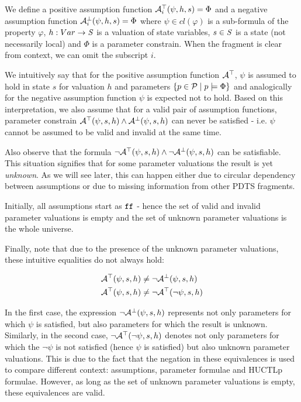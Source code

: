 We define a positive assumption function $\mathcal{A}^\top_i(\psi, h, s) = \Phi$ and a negative assumption function $\mathcal{A}^\bot_i(\psi, h, s) = \Phi$ where $\psi \in cl(\varphi)$ is a sub-formula of the property $\varphi$, $h: Var \to \mathit{S}$ is a valuation of state variables, $s \in \mathit{S}$ is a state (not necessarily local) and $\Phi$ is a parameter constrain. When the fragment is clear from context, we can omit the subscript $i$.

We intuitively say that for the positive assumption function $\mathcal{A}^\top$, $\psi$ is assumed to hold in state $s$ for valuation $h$ and parameters $\{p \in \mathcal{P} \mid p \models \Phi \}$ and analogically for the negative assumption function $\psi$ is expected not to hold. Based on this interpretation, we also assume that for a valid pair of assumption functions, parameter constrain $\mathcal{A}^\top(\psi, s, h) \land \mathcal{A}^\bot(\psi, s, h)$ can never be satisfied - i.e. $\psi$ cannot be assumed to be valid and invalid at the same time.

Also observe that the formula $\neg\mathcal{A}^\top(\psi, s, h) \land \neg\mathcal{A}^\bot(\psi, s, h)$ can be satisfiable. This situation signifies that for some parameter valuations the result is yet \emph{unknown}. As we will see later, this can happen either due to circular dependency between assumptions or due to missing information from other \ac{PDTS} fragments.


Initially, all assumptions start as $\texttt{ff}$ - hence the set of valid and invalid parameter valuations is empty and the set of unknown parameter valuations is the whole universe.

Finally, note that due to the presence of the unknown parameter valuations, these intuitive equalities do not always hold:

\begin{align*}
	\mathcal{A}^\top(\psi, s, h) & \not= \neg \mathcal{A}^\bot(\psi, s, h) \\
	\mathcal{A}^\top(\psi, s, h) & \not= \neg \mathcal{A}^\top(\neg \psi, s, h)
\end{align*}

In the first case, the expression $\neg \mathcal{A}^\bot(\psi, s, h)$ represents not only parameters for which $\psi$ is satisfied, but also parameters for which the result is unknown. Similarly, in the second case, $\neg \mathcal{A}^\top(\neg \psi, s, h)$ denotes not only parameters for which the $\neg \psi$ is not satisfied (hence $\psi$ is satisfied) but also unknown parameter valuations. This is due to the fact that the negation in these equivalences is used to compare different context: assumptions, parameter formulae and \ac{HUCTLp} formulae. However, as long as the set of unknown parameter valuations is empty, these equivalences are valid.

